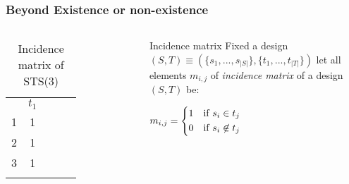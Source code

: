 \begin{frame}
	\frametitle{Beyond Existence or non-existence}
	
\begin{columns}
\begin{table}[]
\begin{tabular}{cccll}
\cline{1-2}
\multicolumn{1}{|c|}{} & \multicolumn{1}{c|}{$t_1$}  &  &  \\ \cline{1-2}
\multicolumn{1}{|c|}{1} & \multicolumn{1}{c|}{1}  &  &  \\ \cline{1-2}
\multicolumn{1}{|c|}{2} & \multicolumn{1}{c|}{1}  &  &  \\ \cline{1-2}
\multicolumn{1}{|c|}{3} & \multicolumn{1}{c|}{1}   &  \\ \cline{1-2}
\multicolumn{1}{l}{}    & \multicolumn{1}{l}{}      &  & 
\end{tabular}
\caption{Incidence matrix of STS(3)}
\end{table}	
\begin{block}{Incidence matrix}
Fixed a design $(S,T) \equiv (\{s_1, ..., s_{|S|} \},\{t_1, ..., t_{|T|} \})$ let all elements $m_{i,j}$ of \textit{incidence matrix} of a design $(S,T)$ be:

\begin{math}
m_{i,j} = 
\begin{cases*}
1 & if $s_i \in t_j$\\
0 & if $s_i \not \in t_j$
\end{cases*}
\end{math}

\end{block}
\end{columns}


\end{frame}

